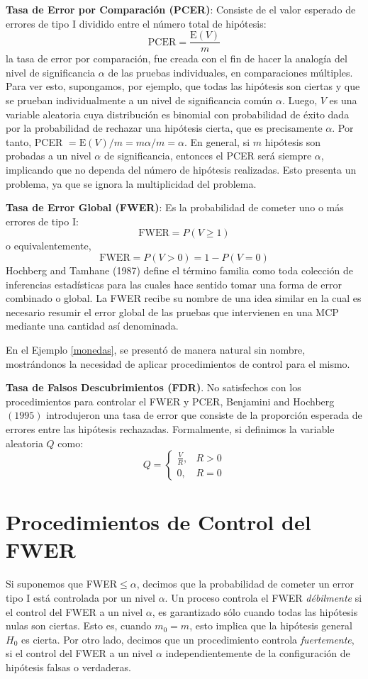 \documentclass{article}
\theoremstyle{definition}
\begin{document}
\textbf{Tasa de Error por Comparación (PCER)}: Consiste de el valor esperado de errores de tipo I dividido entre el número total de hipótesis:
$$
\mathrm{PCER}=\frac{\mathrm{E}(V) }{m}
$$
la tasa de error por comparación, fue creada con el fin de hacer la analogía del nivel de significancia $\alpha$ de las pruebas individuales, en comparaciones múltiples. Para ver esto, supongamos, por ejemplo, que todas las hipótesis son ciertas y que se prueban individualmente a un nivel de significancia común $\alpha$. Luego, $V$ es una variable aleatoria cuya distribución es binomial con probabilidad de éxito dada por la probabilidad de rechazar una hipótesis cierta, que es precisamente $\alpha .$ Por tanto, PCER $=\mathrm{E}(V) / m=m \alpha / m=\alpha .$ En general, si $m$ hipótesis son probadas a un nivel $\alpha$ de significancia, entonces el PCER será siempre $\alpha$, implicando que no dependa del número de hipótesis realizadas. Esto presenta un problema, ya que se ignora la multiplicidad del problema.

\textbf{Tasa de Error Global (FWER)}: Es la probabilidad de cometer uno o más errores de tipo I:
$$
\mathrm{FWER}=P(V \geq 1)
$$
o equivalentemente,
$$
\mathrm{FWER}=P(V>0)=1-P(V=0)
$$
Hochberg and Tamhane (1987) define el término familia como toda colección de inferencias estadísticas para las cuales hace sentido tomar una forma de error combinado o global. La FWER recibe su nombre de una idea similar en la cual es necesario resumir el error global de las pruebas que intervienen en una MCP mediante una cantidad así denominada.

En el Ejemplo \ref{monedas}, se presentó de manera natural sin nombre, mostrándonos la necesidad de aplicar procedimientos de control para el mismo.

\textbf{Tasa de Falsos Descubrimientos (FDR)}. No satisfechos con los procedimientos para controlar el FWER y PCER, Benjamini and Hochberg $(1995)$ introdujeron una tasa de error que consiste de la proporción esperada de errores entre las hipótesis rechazadas. Formalmente, si definimos la variable aleatoria $Q$ como:
$$
Q=\left\{\begin{array}{ll}
	\frac{V}{R}, & R>0 \\
	0, & R=0
\end{array}\right.
$$

\section{Procedimientos de Control del FWER}
Si suponemos que FWER$\leq\alpha$, decimos que 	la probabilidad de cometer un error tipo I está controlada por un nivel $\alpha$.
Un proceso controla el FWER \textit{débilmente} si el control del FWER a un nivel $\alpha$, es garantizado sólo cuando todas las hipótesis  nulas son ciertas. Esto es, cuando $m_0=m$, esto implica que la hipótesis general $H_0$ es cierta. Por otro lado, decimos que un procedimiento controla \textit{fuertemente}, si el control del FWER a un nivel $\alpha$ independientemente de la configuración de hipótesis falsas o verdaderas.
\end{document}
